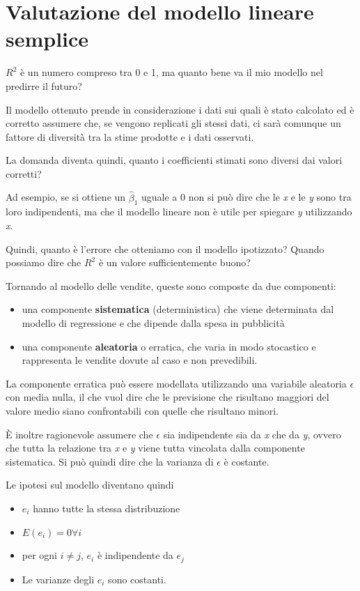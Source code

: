 \section{Valutazione del modello lineare semplice}\label{i-residui}

$R^{2}$ è un numero compreso tra 0 e 1, ma quanto bene va il mio
modello nel predirre il futuro?

Il modello ottenuto prende in considerazione i dati sui quali è stato
calcolato ed è corretto assumere che, se vengono replicati gli stessi
dati, ci sarà comunque un fattore di diversità tra la stime prodotte e i
dati osservati.

La domanda diventa quindi, quanto i coefficienti stimati sono diversi dai
valori corretti? 

Ad esempio, se si ottiene un $\hat{\beta}_1$ uguale a 0 non si può dire che le \emph{x} e le \emph{y} sono tra loro
indipendenti, ma che il modello lineare non è utile per spiegare \emph{y} utilizzando \emph{x}.

Quindi, quanto è l'errore che otteniamo con il modello ipotizzato?
Quando possiamo dire che $R^2$ è un valore sufficientemente
buono?

Tornando al modello delle vendite, queste sono composte da due
componenti:

\begin{itemize}
\item
  una componente \textbf{sistematica} (deterministica) che viene
  determinata dal modello di regressione e che dipende dalla spesa in
  pubblicità
\item
  una componente \textbf{aleatoria} o erratica, che varia in modo
  stocastico e rappresenta le vendite dovute al caso e non prevedibili.
\end{itemize}

La componente erratica può essere modellata utilizzando una variabile
aleatoria $\epsilon$ con media nulla, il che vuol dire che le
previsione che risultano maggiori del valore medio siano confrontabili
con quelle che risultano minori.

È inoltre ragionevole assumere che $\epsilon$ sia indipendente sia
da \emph{x} che da \emph{y}, ovvero che tutta la relazione tra \emph{x}
e \emph{y} viene tutta vincolata dalla componente sistematica. Si può
quindi dire che la varianza di $\epsilon$ è costante.

Le ipotesi sul modello diventano quindi

\begin{itemize}
\item
  $e_i$ hanno tutte la stessa distribuzione
\item
  $E(e_i) = 0 \forall i$
\item
  per ogni $i\neq j$, $e_i$ è indipendente da $e_j$
\item
  Le varianze degli $e_i$ sono costanti.
\end{itemize}

